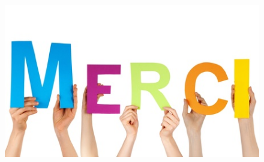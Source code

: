 \documentclass[8pt]{beamer}
\newcommand{\1}{\mathbbm 1}
\begin{document}
\begin{frame}



\begin{figure}[h!]
  \centering
    \includegraphics[scale=0.5]{figures/merci.jpg}
\end{figure}



\end{frame}
\end{document}
